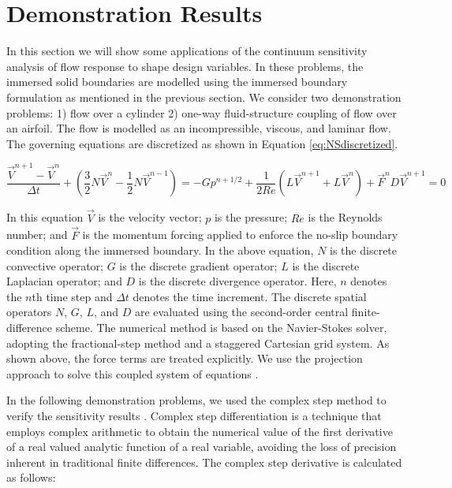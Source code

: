 \documentclass[12pt]{aiaa-pretty}
\begin{document}
\section{Demonstration Results}
In this section we will show some applications of the continuum sensitivity analysis of flow response to shape design variables. In these problems, the immersed solid boundaries are modelled using the immersed boundary formulation as mentioned in the previous section. We consider two demonstration problems: 1) flow over a cylinder 2) one-way fluid-structure coupling of flow over an airfoil. The flow is modelled as an incompressible, viscous, and laminar flow. The governing equations are discretized as shown in Equation \eqref{eq:NSdiscretized}.

%
\begin{subequations}\label{eq:NSdiscretized}
\begin{equation}
	\frac{\vec{V}^{n+1} - \vec{V}^n}{\Delta t} + 
	\left( \frac{3}{2} N\vec{V}^n - \frac{1}{2} N\vec{V}^{n-1} \right) = 
	-G p^{n + 1/2} + 
	\frac{1}{2Re} \left( L \vec{V}^{n+1} + L \vec{V}^n \right) + 
	\vec{F}^n
\end{equation}
\begin{equation}
	D \vec{V}^{n+1} = 0
\end{equation}
\end{subequations}
%

In this equation $\vec{V}$ is the velocity vector; $p$ is the pressure; $Re$ is the Reynolds number; and $\vec{F}$ is the momentum forcing applied to enforce the no-slip boundary condition along the immersed boundary. In the above equation, $N$ is the discrete convective operator; $G$ is the discrete gradient operator; $L$ is the discrete Laplacian operator; and $D$ is the discrete divergence operator. Here, $n$ denotes the $n$th time step and $\Delta t$ denotes the time increment. The discrete spatial operators $N$, $G$, $L$, and $D$ are evaluated using the second-order central finite-difference scheme. The numerical method is based on the Navier-Stokes solver, adopting the fractional-step method and a staggered Cartesian grid system. As shown above, the force terms are treated explicitly. We use the projection approach to solve this coupled system of equations \cite{brown2001accurate}.

In the following demonstration problems, we used the complex step method to verify the sensitivity results \cite{martins2003complex}. Complex step differentiation is a technique that employs complex arithmetic to obtain the numerical value of the first derivative of a real valued analytic function of a real variable, avoiding the loss of precision inherent in traditional finite differences. The complex step derivative is calculated as follows:
\end{document}
